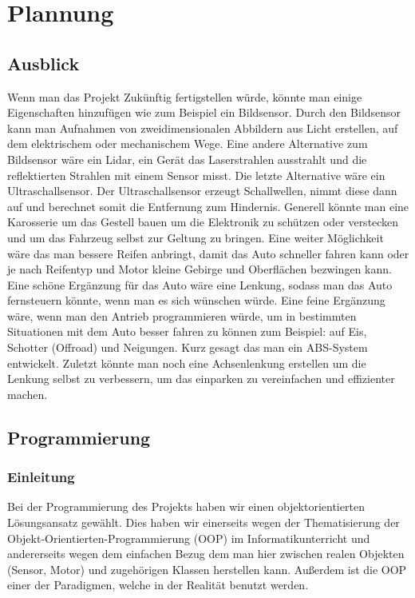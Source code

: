 \documentclass{report}
\begin{document}
\chapter{Plannung}

\section{Ausblick}

Wenn man das Projekt Zukünftig fertigstellen würde, könnte man einige Eigenschaften hinzufügen wie zum Beispiel ein Bildsensor. Durch den Bildsensor kann man Aufnahmen von zweidimensionalen Abbildern aus Licht erstellen, auf dem elektrischem oder mechanischem Wege. Eine andere Alternative zum Bildsensor wäre ein Lidar, ein Gerät das Laserstrahlen ausstrahlt und die reflektierten Strahlen mit einem Sensor misst. Die letzte Alternative wäre ein Ultraschallsensor. Der Ultraschallsensor erzeugt Schallwellen, nimmt diese dann auf und berechnet somit die Entfernung zum Hindernis. Generell könnte man eine Karosserie um das Gestell bauen um die Elektronik zu schützen oder verstecken und um das Fahrzeug selbst zur Geltung zu bringen. Eine weiter Möglichkeit wäre das man bessere Reifen anbringt, damit das Auto schneller fahren kann oder je nach Reifentyp und Motor kleine Gebirge und Oberflächen bezwingen kann. Eine schöne Ergänzung für das Auto wäre eine Lenkung, sodass man das Auto fernsteuern könnte, wenn man es sich wünschen würde. Eine feine Ergänzung wäre, wenn man den Antrieb programmieren würde, um in bestimmten Situationen mit dem Auto besser fahren zu können zum Beispiel: auf Eis, Schotter (Offroad) und Neigungen. Kurz gesagt das man ein ABS-System entwickelt. Zuletzt könnte man noch eine Achsenlenkung erstellen um die Lenkung selbst zu verbessern, um das einparken zu vereinfachen und effizienter machen.

\section{Programmierung}

\subsection{Einleitung}
Bei der Programmierung des Projekts haben wir einen objektorientierten L\"{o}sungsansatz gew\"{a}hlt. Dies haben wir einerseits wegen der Thematisierung der Objekt-Orientierten-Programmierung (OOP) im Informatikunterricht und andererseits wegen dem einfachen Bezug dem man hier zwischen realen Objekten (Sensor, Motor) und zugeh\"{o}rigen Klassen herstellen kann. Au{\ss}erdem ist die OOP einer der Paradigmen, welche in der Realit\"{a}t benutzt werden. 
\end{document}
